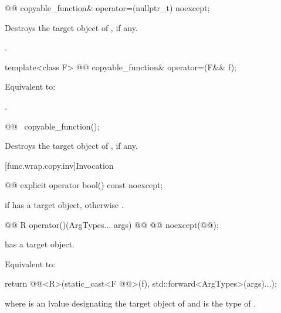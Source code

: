%
\begin{itemdecl}
@@ copyable_function& operator=(nullptr_t) noexcept;
\end{itemdecl}

\begin{itemdescr}
\pnum
\effects
Destroys the target object of , if any.

\pnum
\returns
{}.
\end{itemdescr}

%
\begin{itemdecl}
template<class F>
  @@ copyable_function& operator=(F&& f);
\end{itemdecl}

\begin{itemdescr}
\pnum
\effects
Equivalent to: 

\pnum
\returns
{}.
\end{itemdescr}

%
\begin{itemdecl}
@@ ~copyable_function();
\end{itemdecl}

\begin{itemdescr}
\pnum
\effects
Destroys the target object of , if any.
\end{itemdescr}

[func.wrap.copy.inv]{Invocation}

%
\begin{itemdecl}
@@ explicit operator bool() const noexcept;
\end{itemdecl}

\begin{itemdescr}
\pnum
\returns
{} if  has a target object, otherwise .
\end{itemdescr}

\begin{itemdecl}
@@ R operator()(ArgTypes... args) @\cv{}@ @@ noexcept(@@);
\end{itemdecl}

\begin{itemdescr}
\pnum
\expects
{} has a target object.

\pnum
\effects
Equivalent to:
\begin{codeblock}
return @@<R>(static_cast<F @@>(f), std::forward<ArgTypes>(args)...);
\end{codeblock}
where  is an lvalue designating the target object of  and  is the type of .
\end{itemdescr}

